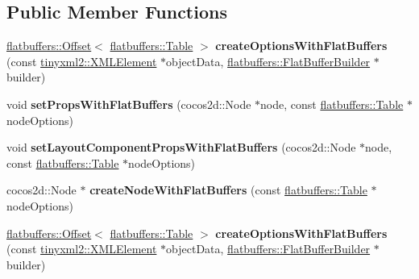 \subsection*{Public Member Functions}
\begin{DoxyCompactItemize}
\item 
\mbox{\label{classcocostudio_1_1NodeReader_a5c885c43aef5fda395d5189164d57b09}} 
\hyperlink{structflatbuffers_1_1Offset}{flatbuffers\+::\+Offset}$<$ \hyperlink{classflatbuffers_1_1Table}{flatbuffers\+::\+Table} $>$ {\bfseries create\+Options\+With\+Flat\+Buffers} (const \hyperlink{classtinyxml2_1_1XMLElement}{tinyxml2\+::\+X\+M\+L\+Element} $\ast$object\+Data, \hyperlink{classflatbuffers_1_1FlatBufferBuilder}{flatbuffers\+::\+Flat\+Buffer\+Builder} $\ast$builder)
\item 
\mbox{\label{classcocostudio_1_1NodeReader_ab928c4f5171ad58f5a53ec650873404c}} 
void {\bfseries set\+Props\+With\+Flat\+Buffers} (cocos2d\+::\+Node $\ast$node, const \hyperlink{classflatbuffers_1_1Table}{flatbuffers\+::\+Table} $\ast$node\+Options)
\item 
\mbox{\label{classcocostudio_1_1NodeReader_a87c431a0caa730445329968ea11bfc8b}} 
void {\bfseries set\+Layout\+Component\+Props\+With\+Flat\+Buffers} (cocos2d\+::\+Node $\ast$node, const \hyperlink{classflatbuffers_1_1Table}{flatbuffers\+::\+Table} $\ast$node\+Options)
\item 
\mbox{\label{classcocostudio_1_1NodeReader_a62adb521d6b7788000b41cf6ee672f92}} 
cocos2d\+::\+Node $\ast$ {\bfseries create\+Node\+With\+Flat\+Buffers} (const \hyperlink{classflatbuffers_1_1Table}{flatbuffers\+::\+Table} $\ast$node\+Options)
\item 
\mbox{\label{classcocostudio_1_1NodeReader_ac42e7079b14de29fc6bbae870c1c9f9d}} 
\hyperlink{structflatbuffers_1_1Offset}{flatbuffers\+::\+Offset}$<$ \hyperlink{classflatbuffers_1_1Table}{flatbuffers\+::\+Table} $>$ {\bfseries create\+Options\+With\+Flat\+Buffers} (const \hyperlink{classtinyxml2_1_1XMLElement}{tinyxml2\+::\+X\+M\+L\+Element} $\ast$object\+Data, \hyperlink{classflatbuffers_1_1FlatBufferBuilder}{flatbuffers\+::\+Flat\+Buffer\+Builder} $\ast$builder)
\item 

\end{DoxyCompactItemize}
